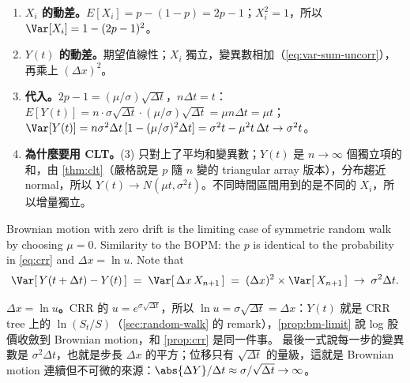 \suppstart
{}

\begin{remark}
	\begin{enumerate}[(1),nosep]
		\item \textbf{$X_{i}$ 的動差。}$E[X_{i}]=p-(1-p)=2p-1$；$X_{i}^{2}=1$，所以 $\Var[X_{i}]=1-(2p-1)^{2}$。
		\item \textbf{$Y(t)$ 的動差。}期望值線性；$X_{i}$ 獨立，變異數相加（\eqref{eq:var-sum-uncorr}），再乘上 $(\Delta x)^{2}$。
		\item \textbf{代入。}$2p-1=(\mu/\sigma)\sqrt{\Delta t}$，$n\Delta t=t$：$E[Y(t)]=n\cdot\sigma\sqrt{\Delta t}\cdot(\mu/\sigma)\sqrt{\Delta t}=\mu n\Delta t=\mu t$；$\Var[Y(t)]=n\sigma^{2}\Delta t\,[1-(\mu/\sigma)^{2}\Delta t]=\sigma^{2}t-\mu^{2}t\,\Delta t\to\sigma^{2}t$。
		\item \textbf{為什麼要用 CLT。}(3) 只對上了平均和變異數；$Y(t)$ 是 $n\to\infty$ 個獨立項的和，由 \autoref{thm:clt}（嚴格說是 $p$ 隨 $n$ 變的 triangular array 版本），分布趨近 normal，所以 $Y(t)\to N(\mu t,\sigma^{2}t)$。不同時間區間用到的是不同的 $X_{i}$，所以增量獨立。
	\end{enumerate}
\end{remark}
\suppend

Brownian motion with zero drift is the limiting case of symmetric random walk by choosing $\mu=0$.
Similarity to the BOPM: the $p$ is identical to the probability in \eqref{eq:crr} and $\Delta x=\ln u$.
Note that
\[
	\Var[\,Y(t+\Delta t)-Y(t)\,] \;=\; \Var[\,\Delta x\,X_{n+1}\,] \;=\; (\Delta x)^{2}\times\Var[\,X_{n+1}\,] \;\to\; \sigma^{2}\Delta t .
\]

\suppstart
{}

\begin{remark}
	\textbf{$\Delta x=\ln u$。}CRR 的 $u=e^{\sigma\sqrt{\Delta t}}$，所以 $\ln u=\sigma\sqrt{\Delta t}=\Delta x$：$Y(t)$ 就是 CRR tree 上的 $\ln(S_{t}/S)$（\autoref{sec:random-walk} 的 remark），\autoref{prop:bm-limit} 說 log 股價收斂到 Brownian motion，和 \autoref{prop:crr} 是同一件事。
	最後一式說每一步的變異數是 $\sigma^{2}\Delta t$，也就是步長 $\Delta x$ 的平方；位移只有 $\sqrt{\Delta t}$ 的量級，這就是 Brownian motion 連續但不可微的來源：$\abs{\Delta Y}/\Delta t\approx\sigma/\sqrt{\Delta t}\to\infty$。
\end{remark}
\suppend

